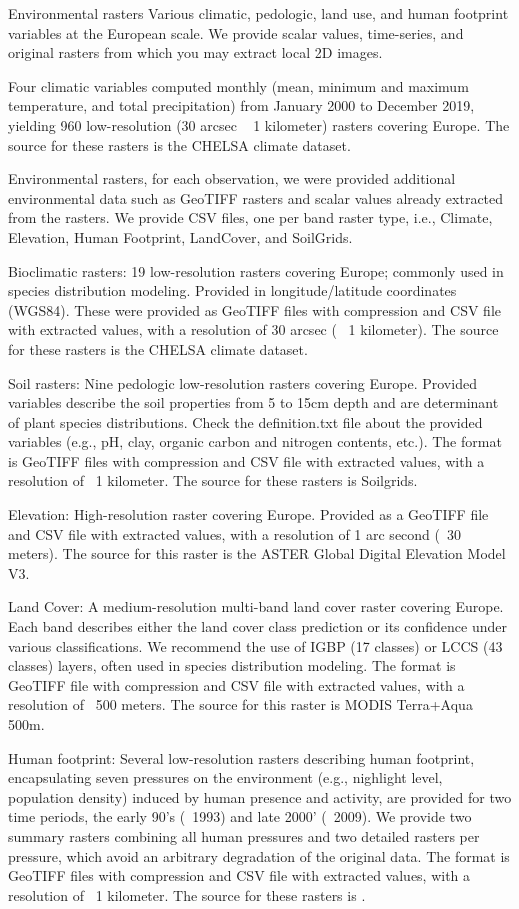 Environmental rasters Various climatic, pedologic, land use, and human footprint variables at the European scale. We provide scalar values, time-series, and original rasters from which you may extract local 2D images.

Four climatic variables computed monthly (mean, minimum and maximum temperature, and total precipitation) from January 2000 to December 2019, yielding 960 low-resolution (30 arcsec ~ 1 kilometer) rasters covering Europe. The source for these rasters is the CHELSA climate dataset.

Environmental rasters, for each observation, we were provided additional environmental data such as GeoTIFF rasters and scalar values already extracted from the rasters. We provide CSV files, one per band raster type, i.e., Climate, Elevation, Human Footprint, LandCover, and SoilGrids.

Bioclimatic rasters: 19 low-resolution rasters covering Europe; commonly used in species distribution modeling. Provided in longitude/latitude coordinates (WGS84). These were provided as GeoTIFF files with compression and CSV file with extracted values, with a resolution of 30 arcsec (~ 1 kilometer). The source for these rasters is the CHELSA climate dataset.

Soil rasters: Nine pedologic low-resolution rasters covering Europe. Provided variables describe the soil properties from 5 to 15cm depth and are determinant of plant species distributions. Check the definition.txt file about the provided variables (e.g., pH, clay, organic carbon and nitrogen contents, etc.). The format is GeoTIFF files with compression and CSV file with extracted values, with a resolution of ~1 kilometer. The source for these rasters is Soilgrids.

Elevation: High-resolution raster covering Europe. Provided as a GeoTIFF file and CSV file with extracted values, with a resolution of 1 arc second (~30 meters). The source for this raster is the ASTER Global Digital Elevation Model V3.

Land Cover: A medium-resolution multi-band land cover raster covering Europe. Each band describes either the land cover class prediction or its confidence under various classifications. We recommend the use of IGBP (17 classes) or LCCS (43 classes) layers, often used in species distribution modeling. The format is GeoTIFF file with compression and CSV file with extracted values, with a resolution of ~500 meters. The source for this raster is MODIS Terra+Aqua 500m.

Human footprint: Several low-resolution rasters describing human footprint, encapsulating seven pressures on the environment (e.g., nighlight level, population density) induced by human presence and activity, are provided for two time periods, the early 90's (~1993) and late 2000' (~2009). We provide two summary rasters combining all human pressures and two detailed rasters per pressure, which avoid an arbitrary degradation of the original data. The format is GeoTIFF files with compression and CSV file with extracted values, with a resolution of ~1 kilometer. The source for these rasters is \cite{human-footprint-dataset-2016}.